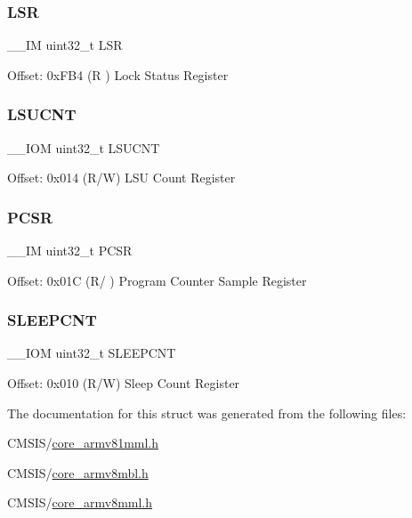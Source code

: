 \subsubsection{\texorpdfstring{LSR}{LSR}}
{\footnotesize\ttfamily \+\_\+\+\_\+\+IM uint32\+\_\+t L\+SR}

Offset\+: 0x\+F\+B4 (R ) Lock Status Register \mbox{\label{struct_d_w_t___type_ae886261750c8c90d67a2f276d074e9c3}} 
\subsubsection{\texorpdfstring{LSUCNT}{LSUCNT}}
{\footnotesize\ttfamily \+\_\+\+\_\+\+I\+OM uint32\+\_\+t L\+S\+U\+C\+NT}

Offset\+: 0x014 (R/W) L\+SU Count Register \mbox{\label{struct_d_w_t___type_a72e52fffe9ac6af0ee15877e2d5dac41}} 
\subsubsection{\texorpdfstring{PCSR}{PCSR}}
{\footnotesize\ttfamily \+\_\+\+\_\+\+IM uint32\+\_\+t P\+C\+SR}

Offset\+: 0x01C (R/ ) Program Counter Sample Register \mbox{\label{struct_d_w_t___type_aafa1400cd3168b21652b86599ad3ed83}} 
\subsubsection{\texorpdfstring{SLEEPCNT}{SLEEPCNT}}
{\footnotesize\ttfamily \+\_\+\+\_\+\+I\+OM uint32\+\_\+t S\+L\+E\+E\+P\+C\+NT}

Offset\+: 0x010 (R/W) Sleep Count Register 

The documentation for this struct was generated from the following files\+:\begin{DoxyCompactItemize}
\item 
C\+M\+S\+I\+S/\mbox{\hyperlink{core__armv81mml_8h}{core\+\_\+armv81mml.\+h}}\item 
C\+M\+S\+I\+S/\mbox{\hyperlink{core__armv8mbl_8h}{core\+\_\+armv8mbl.\+h}}\item 
C\+M\+S\+I\+S/\mbox{\hyperlink{core__armv8mml_8h}{core\+\_\+armv8mml.\+h}}\end{DoxyCompactItemize}
